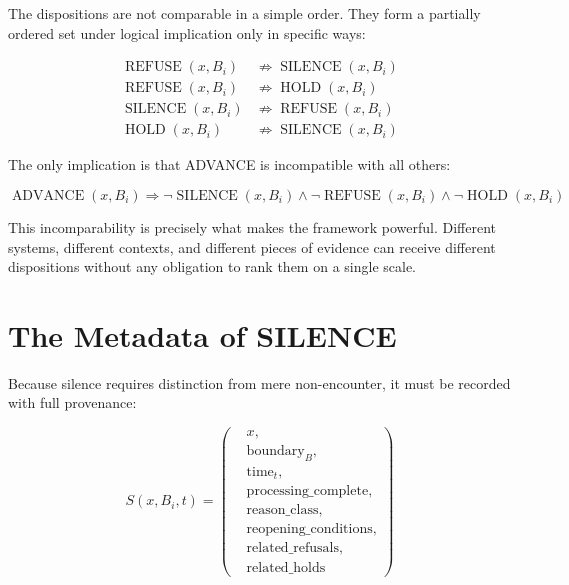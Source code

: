 \documentclass[12pt]{article}
\begin{document}
The dispositions are not comparable in a simple order. They form a partially ordered set under logical implication only in specific ways:

\begin{equation}
\begin{aligned}
\operatorname{REFUSE}(x, B_i) &\not\Rightarrow \operatorname{SILENCE}(x, B_i)\\
\operatorname{REFUSE}(x, B_i) &\not\Rightarrow \operatorname{HOLD}(x, B_i)\\
\operatorname{SILENCE}(x, B_i) &\not\Rightarrow \operatorname{REFUSE}(x, B_i)\\
\operatorname{HOLD}(x, B_i) &\not\Rightarrow \operatorname{SILENCE}(x, B_i)
\end{aligned}
\end{equation}

The only implication is that ADVANCE is incompatible with all others:

\begin{equation}
\operatorname{ADVANCE}(x, B_i) \Rightarrow \neg\operatorname{SILENCE}(x, B_i) \wedge \neg\operatorname{REFUSE}(x, B_i) \wedge \neg\operatorname{HOLD}(x, B_i)
\end{equation}

This incomparability is precisely what makes the framework powerful. Different systems, different contexts, and different pieces of evidence can receive different dispositions without any obligation to rank them on a single scale.

\section{The Metadata of SILENCE}

Because silence requires distinction from mere non-encounter, it must be recorded with full provenance:

\begin{equation}
S(x, B_i, t) = \left(
\begin{aligned}
&x,\\
&\text{boundary}_B,\\
&\text{time}_t,\\
&\text{processing\_complete},\\
&\text{reason\_class},\\
&\text{reopening\_conditions},\\
&\text{related\_refusals},\\
&\text{related\_holds}
\end{aligned}
\right)
\end{equation}
\end{document}
